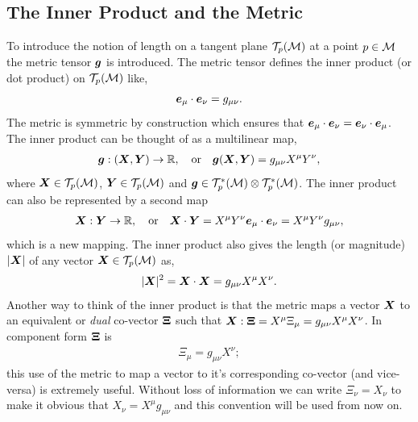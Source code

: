 \subsection{The Inner Product and the Metric} \label{intro:sec:dotprod}
To introduce the notion of length on a tangent plane $\mathcal{T}_p(\mathcal{M})$ at a point $p\in\mathcal{M}$ the metric tensor $\boldsymbol{g}$ is introduced. \color{orchid}The metric tensor defines the inner product (or dot product) on $\mathcal{T}_p(\mathcal{M})$ like,
\begin{equation}
 \boldsymbol{e}_\mu \cdot \boldsymbol{e}_\nu=g_{\mu\nu}.
\end{equation}
The metric is symmetric by construction which ensures that \color{black} $\boldsymbol{e}_\mu \cdot \boldsymbol{e}_\nu=\boldsymbol{e}_\nu \cdot \boldsymbol{e}_\mu$. The inner product can be thought of as a multilinear map,
\begin{gather}
\boldsymbol{g} : (\boldsymbol{X} , \boldsymbol{Y}) \rightarrow \mathbb{R} , \quad \mathrm{or} \quad
\boldsymbol{g}(\boldsymbol{X},\boldsymbol{Y}) = g_{\mu\nu} X^\mu Y^\nu,
\end{gather}
where $\boldsymbol{X}\in \mathcal{T}_p(\mathcal{M})$, $\boldsymbol{Y}\in \mathcal{T}_p(\mathcal{M})$ and $\boldsymbol{g}\in \mathcal{T}^*_p(\mathcal{M})\otimes  \mathcal{T}^*_p(\mathcal{M})$. The inner product can also be represented by a second map
\begin{gather}
\boldsymbol{X} : \boldsymbol{Y} \rightarrow \mathbb{R} , \quad \mathrm{or} \quad
\boldsymbol{X} \cdot \boldsymbol{Y} = X^\mu Y^\nu \boldsymbol{e}_\mu \cdot \boldsymbol{e}_\nu = X^\mu Y^\nu g_{\mu\nu},
\end{gather}
which is a new mapping. The inner product also gives the length (or magnitude) $|\boldsymbol{X}|$ of any vector $\boldsymbol{X}\in \mathcal{T}_p(\mathcal{M})$ as,
\begin{equation}
|\boldsymbol{X}|^2 = \boldsymbol{X} \cdot \boldsymbol{X} = g_{\mu\nu}X^\mu X^\nu.
\end{equation}
Another way to think of the inner product is that the metric maps a vector $\boldsymbol{X}$ to an equivalent or {\it dual} co-vector $\boldsymbol{\Xi}$ such that $\boldsymbol{X} : \boldsymbol{\Xi} = X^\mu \Xi_\mu= g_{\mu\nu}X^\mu X^\nu$. In component form $\boldsymbol{\Xi}$ is
\begin{align}
\Xi_\mu = g_{\mu\nu}X^\nu;
\end{align}
this use of the metric to map a vector to it's corresponding co-vector (and vice-versa) is extremely useful. Without loss of information we can write $\Xi_\nu = X_\nu$ to make it obvious that $X_\nu = X^\mu g_{\mu\nu}$ and this convention will be used from now on.

